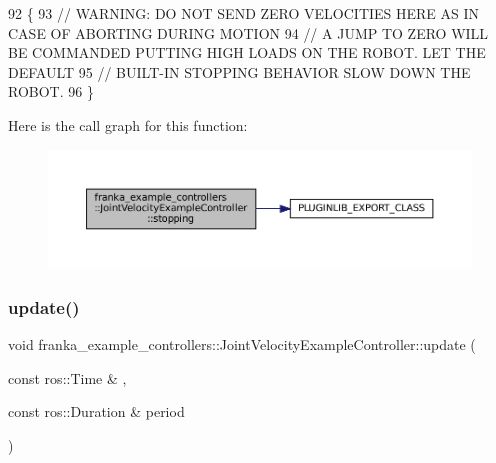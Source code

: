 \begin{DoxyCode}
92                                                               \{
93   \textcolor{comment}{// WARNING: DO NOT SEND ZERO VELOCITIES HERE AS IN CASE OF ABORTING DURING MOTION}
94   \textcolor{comment}{// A JUMP TO ZERO WILL BE COMMANDED PUTTING HIGH LOADS ON THE ROBOT. LET THE DEFAULT}
95   \textcolor{comment}{// BUILT-IN STOPPING BEHAVIOR SLOW DOWN THE ROBOT.}
96 \}
\end{DoxyCode}
Here is the call graph for this function\+:
\nopagebreak
\begin{figure}[H]
\begin{center}
\leavevmode
\includegraphics[width=350pt]{classfranka__example__controllers_1_1JointVelocityExampleController_ae7557a0ea289d4d427f393fd5a4866b5_cgraph}
\end{center}
\end{figure}
\mbox{\label{classfranka__example__controllers_1_1JointVelocityExampleController_af25c5523cd2f79a7bd2da9cc1a5348d6}} 
\subsubsection{\texorpdfstring{update()}{update()}}
{\footnotesize\ttfamily void franka\+\_\+example\+\_\+controllers\+::\+Joint\+Velocity\+Example\+Controller\+::update (\begin{DoxyParamCaption}\item[{const ros\+::\+Time \&}]{,  }\item[{const ros\+::\+Duration \&}]{period }\end{DoxyParamCaption})\hspace{0.3cm}{\ttfamily [override]}}




